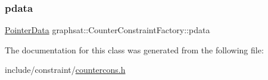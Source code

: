 \subsubsection{\texorpdfstring{pdata}{pdata}}
{\footnotesize\ttfamily \mbox{\hyperlink{classgraphsat_1_1_pointer_data}{Pointer\+Data}} graphsat\+::\+Counter\+Constraint\+Factory\+::pdata\hspace{0.3cm}{\ttfamily [private]}}



The documentation for this class was generated from the following file\+:\begin{DoxyCompactItemize}
\item 
include/constraint/\mbox{\hyperlink{countercons_8h}{countercons.\+h}}\end{DoxyCompactItemize}

